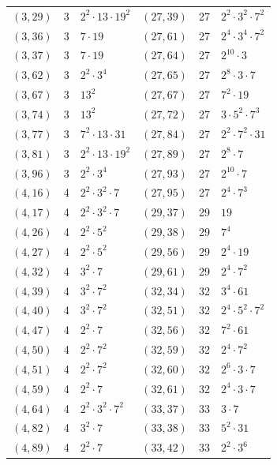 \documentclass[11pt]{article}
\begin{document}
\begin{longtable}{@{}lrl@{\qquad}lrl@{}}
$(3,29)$ & 3 & $2^{2}\cdot 13\cdot 19^{2}$ & $(27,39)$ & 27 & $2^{2}\cdot 3^{2}\cdot 7^{2}$\\
$(3,36)$ & 3 & $7\cdot 19$ & $(27,61)$ & 27 & $2^{4}\cdot 3^{4}\cdot 7^{2}$\\
$(3,37)$ & 3 & $7\cdot 19$ & $(27,64)$ & 27 & $2^{10}\cdot 3$\\
$(3,62)$ & 3 & $2^{2}\cdot 3^{4}$ & $(27,65)$ & 27 & $2^{8}\cdot 3\cdot 7$\\
$(3,67)$ & 3 & $13^{2}$ & $(27,67)$ & 27 & $7^{2}\cdot 19$\\
$(3,74)$ & 3 & $13^{2}$ & $(27,72)$ & 27 & $3\cdot 5^{2}\cdot 7^{3}$\\
$(3,77)$ & 3 & $7^{2}\cdot 13\cdot 31$ & $(27,84)$ & 27 & $2^{2}\cdot 7^{2}\cdot 31$\\
$(3,81)$ & 3 & $2^{2}\cdot 13\cdot 19^{2}$ & $(27,89)$ & 27 & $2^{8}\cdot 7$\\
$(3,96)$ & 3 & $2^{2}\cdot 3^{4}$ & $(27,93)$ & 27 & $2^{10}\cdot 7$\\
$(4,16)$ & 4 & $2^{2}\cdot 3^{2}\cdot 7$ & $(27,95)$ & 27 & $2^{4}\cdot 7^{3}$\\
$(4,17)$ & 4 & $2^{2}\cdot 3^{2}\cdot 7$ & $(29,37)$ & 29 & $19$\\
$(4,26)$ & 4 & $2^{2}\cdot 5^{2}$ & $(29,38)$ & 29 & $7^{4}$\\
$(4,27)$ & 4 & $2^{2}\cdot 5^{2}$ & $(29,56)$ & 29 & $2^{4}\cdot 19$\\
$(4,32)$ & 4 & $3^{2}\cdot 7$ & $(29,61)$ & 29 & $2^{4}\cdot 7^{2}$\\
$(4,39)$ & 4 & $3^{2}\cdot 7^{2}$ & $(32,34)$ & 32 & $3^{4}\cdot 61$\\
$(4,40)$ & 4 & $3^{2}\cdot 7^{2}$ & $(32,51)$ & 32 & $2^{4}\cdot 5^{2}\cdot 7^{2}$\\
$(4,47)$ & 4 & $2^{2}\cdot 7$ & $(32,56)$ & 32 & $7^{2}\cdot 61$\\
$(4,50)$ & 4 & $2^{2}\cdot 7^{2}$ & $(32,59)$ & 32 & $2^{4}\cdot 7^{2}$\\
$(4,51)$ & 4 & $2^{2}\cdot 7^{2}$ & $(32,60)$ & 32 & $2^{6}\cdot 3\cdot 7$\\
$(4,59)$ & 4 & $2^{2}\cdot 7$ & $(32,61)$ & 32 & $2^{4}\cdot 3\cdot 7$\\
$(4,64)$ & 4 & $2^{2}\cdot 3^{2}\cdot 7^{2}$ & $(33,37)$ & 33 & $3\cdot 7$\\
$(4,82)$ & 4 & $3^{2}\cdot 7$ & $(33,38)$ & 33 & $5^{2}\cdot 31$\\
$(4,89)$ & 4 & $2^{2}\cdot 7$ & $(33,42)$ & 33 & $2^{2}\cdot 3^{6}$\\

\end{longtable}
\end{document}
